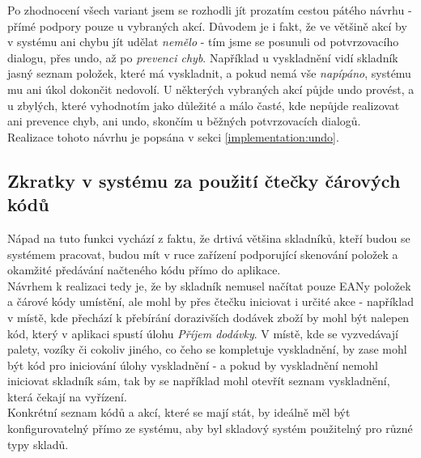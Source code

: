 Po zhodnocení všech variant jsem se rozhodli jít prozatím cestou pátého návrhu - přímé podpory pouze u vybraných akcí. Důvodem je i fakt, že ve většině akcí by v systému ani chybu jít udělat \emph{nemělo} - tím jsme se posunuli od potvrzovacího dialogu, přes undo, až po \emph{prevenci chyb}. Například u vyskladnění vidí skladník jasný seznam položek, které má vyskladnit, a pokud nemá vše \emph{napípáno}, systému mu ani úkol dokončit nedovolí. U některých vybraných akcí půjde undo provést, a u zbylých, které vyhodnotím jako důležité a málo časté, kde nepůjde realizovat ani prevence chyb, ani undo, skončím u běžných potvrzovacích dialogů.\\
Realizace tohoto návrhu je popsána v sekci \ref{implementation:undo}.


\subsection{Zkratky v systému za použití čtečky čárových kódů}

Nápad na tuto funkci vychází z faktu, že drtivá většina skladníků, kteří budou se systémem pracovat, budou mít v ruce zařízení podporující skenování položek a okamžité předávání načteného kódu přímo do aplikace.\\
Návrhem k realizaci tedy je, že by skladník nemusel načítat pouze EANy položek a čárové kódy umístění, ale mohl by přes čtečku iniciovat i určité akce - například v místě, kde přechází k přebírání dorazivších dodávek zboží by mohl být nalepen kód, který v aplikaci spustí úlohu \emph{Příjem dodávky}. V místě, kde se vyzvedávají palety, vozíky či cokoliv jiného, co čeho se kompletuje vyskladnění, by zase mohl být kód pro iniciování úlohy vyskladnění - a pokud by vyskladnění nemohl iniciovat skladník sám, tak by se například mohl otevřít seznam vyskladnění, která čekají na vyřízení.\\
Konkrétní seznam kódů a akcí, které se mají stát, by ideálně měl být konfigurovatelný přímo ze systému, aby byl skladový systém použitelný pro různé typy skladů.
